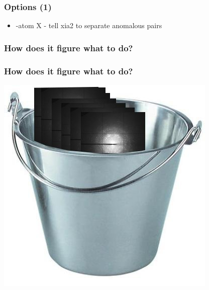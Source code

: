 \documentclass[slides,compress]{beamer}
\begin{document}
\begin{frame}
\frametitle{Options (1)}
\begin{itemize}
\item{-atom X - tell xia2 to separate anomalous pairs}
\end{itemize}
\end{frame}

\begin{frame}
\frametitle{How does it figure what to do?}
\begin{itemize}
\end{itemize}
\end{frame}

\begin{frame}
\frametitle{How does it figure what to do?}
\hspace{3cm}
\includegraphics[scale=0.4]{figures/bucket-of-images.jpg}
\end{frame}
\end{document}
